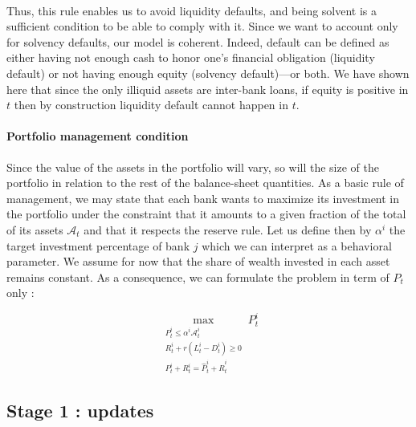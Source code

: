 \documentclass{article}
\newcommand{\othernote}[1]{\textcolor{darkgreen}{\textit{Dimitri: #1}}}
\begin{document}
\paragraph{}
Thus, this rule enables us to avoid liquidity defaults, and being solvent is a sufficient condition to be able to comply with it. Since we want to account only for solvency defaults, our model is coherent. Indeed, default can be defined as either having not enough cash to honor one's financial obligation (liquidity default) or not having enough equity (solvency default)---or both. We have shown here that since the only illiquid assets are inter-bank loans, if equity is positive in $t$ then by construction liquidity default cannot happen in $t$. 



\paragraph{Portfolio management condition}
Since the value of the assets in the portfolio will vary, so will the size of the portfolio in relation to the rest of the balance-sheet quantities. As a basic rule of management, we may state that each bank wants to maximize its investment in the portfolio under the constraint that it amounts to a given fraction of the total of its assets $\mathcal{A}_t$ and that it respects the reserve rule. Let us define then by $\alpha^i$ the target investment percentage of bank $j$ which we can interpret as a behavioral parameter. We assume for now that the share of wealth invested in each asset remains constant. As a consequence, we  can formulate the problem in term of $P_t$ only :

$$\max_{\substack{P_t^i \leq \alpha^i \mathcal{A}_t^i \\ R_t^i + r(L_t^i - D_t^i) \geq 0 \\ P_t^i + R_t^i = \widehat{P}_t^i + \widehat{R}_t^i}} P_t^i$$


\subsection{Stage 1 : updates}\label{updates}
\end{document}

